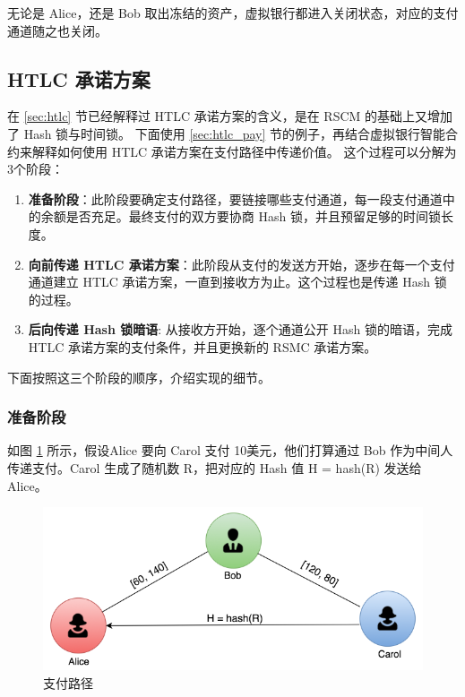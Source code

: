 \begin{appendices}
无论是 Alice，还是 Bob 取出冻结的资产，虚拟银行都进入关闭状态，对应的支付通道随之也关闭。

\subsection{HTLC 承诺方案}
在 \ref{sec:htlc} 节已经解释过 HTLC 承诺方案的含义，是在 RSCM 的基础上又增加了 Hash 锁与时间锁。
下面使用 \ref{sec:htlc_pay} 节的例子，再结合虚拟银行智能合约来解释如何使用 HTLC 承诺方案在支付路径中传递价值。
这个过程可以分解为3个阶段：
\begin{enumerate}
    \item \textbf{准备阶段}：此阶段要确定支付路径，要链接哪些支付通道，每一段支付通道中的余额是否充足。最终支付的双方要协商 Hash 锁，并且预留足够的时间锁长度。
    \item \textbf{向前传递 HTLC 承诺方案}：此阶段从支付的发送方开始，逐步在每一个支付通道建立 HTLC 承诺方案，一直到接收方为止。这个过程也是传递 Hash 锁的过程。
    \item \textbf{后向传递 Hash 锁暗语}: 从接收方开始，逐个通道公开 Hash 锁的暗语，完成 HTLC 承诺方案的支付条件，并且更换新的 RSMC 承诺方案。
\end{enumerate}

下面按照这三个阶段的顺序，介绍实现的细节。

\subsubsection{准备阶段}

如图 \ref{fig:A_channels} 所示，假设Alice 要向 Carol 支付 10美元，他们打算通过 Bob 作为中间人传递支付。Carol 生成了随机数 R，把对应的 Hash 值 H = hash(R) 发送给 Alice。

\begin{figure}[h!]
    \centering
    \includegraphics[width=12cm, keepaspectratio]{../images/channels.png}
    \caption{支付路径}
    \label{fig:A_channels}
\end{figure}



\end{appendices}
